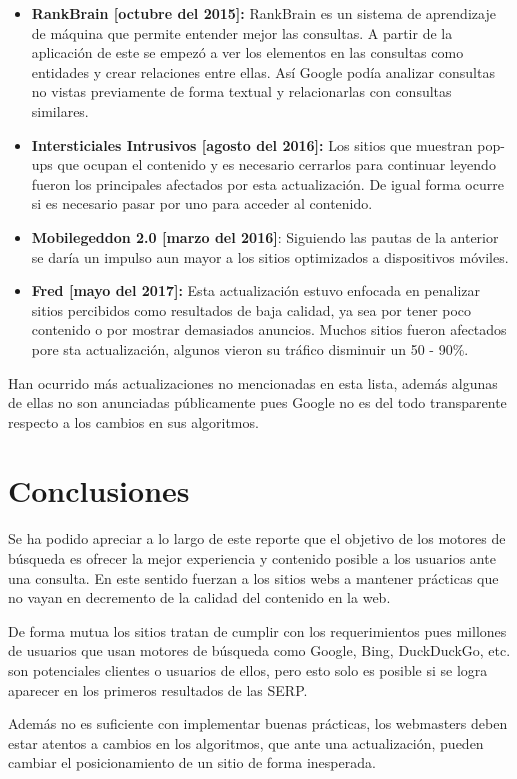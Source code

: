 \documentclass[12pt]{article}
\begin{document}
\begin{itemize}
\item \textbf{RankBrain [octubre del 2015]:} RankBrain es un sistema de aprendizaje de máquina que permite entender mejor las consultas. A partir de la aplicación de este se empezó a ver los elementos en las consultas como entidades y crear relaciones entre ellas. Así Google podía analizar consultas no vistas previamente de forma textual y relacionarlas con consultas similares.

\item \textbf{Intersticiales Intrusivos [agosto del 2016]:} Los sitios que muestran pop-ups que ocupan el contenido y es necesario cerrarlos para continuar leyendo fueron los principales afectados por esta actualización. De igual forma ocurre si es necesario pasar por uno para acceder al contenido.

\item \textbf{Mobilegeddon 2.0 [marzo del 2016]}: Siguiendo las pautas de la anterior se daría un impulso aun mayor a los sitios optimizados a dispositivos móviles. \cite{mobilgeddon2}

\item \textbf{Fred [mayo del 2017]:} Esta actualización estuvo enfocada en penalizar sitios percibidos como resultados de baja calidad, ya sea por tener poco contenido o por mostrar demasiados anuncios. Muchos sitios fueron afectados pore sta actualización, algunos vieron su tráfico disminuir un 50 - 90\%. \cite{fred}

\end{itemize}

Han ocurrido más actualizaciones no mencionadas en esta lista, además algunas de ellas no son anunciadas públicamente pues Google no es del todo transparente respecto a los cambios en sus algoritmos.

\section{Conclusiones}

Se ha podido apreciar a lo largo de este reporte que el objetivo de los motores de búsqueda es ofrecer la mejor experiencia y contenido posible a los usuarios ante una consulta. En este sentido fuerzan a los sitios webs a mantener prácticas que no vayan en decremento de la calidad del contenido en la web.

De forma mutua los sitios tratan de cumplir con los requerimientos pues millones de usuarios que usan motores de búsqueda como Google, Bing, DuckDuckGo, etc. son potenciales clientes o usuarios de ellos, pero esto solo es posible si se logra aparecer en los primeros resultados de las SERP.

Además no es suficiente con implementar buenas prácticas, los webmasters deben estar atentos a cambios en los algoritmos, que ante una actualización, pueden cambiar el posicionamiento de un sitio de forma inesperada.

 

\end{document}
